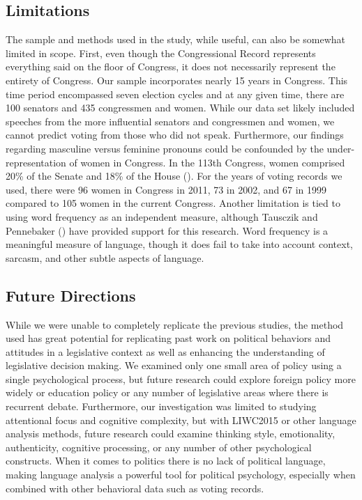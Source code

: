 \documentclass[jou,a4paper]{apa6}
\begin{document}
\subsection{Limitations}

The sample and methods used in the study, while useful, can also be somewhat limited in scope. First, even though the Congressional Record represents everything said on the floor of Congress, it does not necessarily represent the entirety of Congress. Our sample incorporates nearly 15 years in Congress. This time period encompassed seven election cycles and at any given time, there are 100 senators and 435 congressmen and women. While our data set likely included speeches from the more influential senators and congressmen and women, we cannot predict voting from those who did not speak. Furthermore, our findings regarding masculine versus feminine pronouns could be confounded by the under-representation of women in Congress. In the 113th Congress, women comprised 20\% of the Senate and 18\% of the House (\cite{Manning2014}). For the years of voting records we used, there were 96 women in Congress in 2011, 73 in 2002, and 67 in 1999 compared to 105 women in the current Congress. Another limitation is tied to using word frequency as an independent measure, although Tausczik and Pennebaker (\citeyear{Tausczik2011}) have provided support for this research. Word frequency is a meaningful measure of language, though it does fail to take into account context, sarcasm, and other subtle aspects of language.

\subsection{Future Directions}

While we were unable to completely replicate the previous studies, the method used has great potential for replicating past work on political behaviors and attitudes in a legislative context as well as enhancing the understanding of legislative decision making. We examined only one small area of policy using a single psychological process, but future research could explore foreign policy more widely or education policy or any number of legislative areas where there is recurrent debate. Furthermore, our investigation was limited to studying attentional focus and cognitive complexity, but with LIWC2015 or other language analysis methods, future research could examine thinking style, emotionality, authenticity, cognitive processing, or any number of other psychological constructs. When it comes to politics there is no lack of political language, making language analysis a powerful tool for political psychology, especially when combined with other behavioral data such as voting records.
\end{document}
